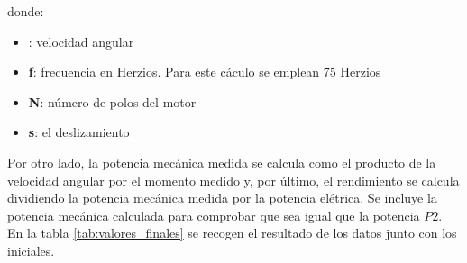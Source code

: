 \documentclass[12pt]{article}
\begin{document}
donde:
\begin{itemize}
    \item \textbf{\omega}: velocidad angular
    \item \textbf{f}: frecuencia en Herzios. Para este cáculo se emplean 75 Herzios
    \item \textbf{N}: número de polos del motor
    \item \textbf{s}: el deslizamiento
\end{itemize}
Por otro lado, la potencia mecánica medida se calcula como el producto de la velocidad angular por el momento medido y, por último, el rendimiento se calcula dividiendo la potencia mecánica medida por la potencia elétrica. Se incluye la potencia mecánica calculada para comprobar que sea igual que la potencia $P2$. En la tabla \ref{tab:valores_finales} se recogen el resultado de los datos junto con los iniciales.
\end{document}
